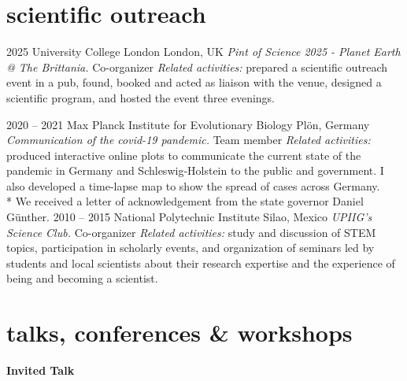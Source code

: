 \documentclass[]{friggeri-cv} %
\begin{document}
\section{scientific outreach}

\begin{entrylist}
\entry
{2025}
{}
{University College London}
{London, UK}
{{\normalsize\emph{Pint of Science 2025 - Planet Earth @ The Brittania.} Co-organizer}}
{\emph{Related activities:} prepared a scientific outreach event in a pub, found, booked and acted as liaison with the venue, designed a scientific program, and hosted the event three evenings.}
\end{entrylist}
\begin{entrylist}
\entry
{2020 -- 2021}
{}
{Max Planck Institute for Evolutionary Biology}
{Plön, Germany}
{{\normalsize\emph{Communication of the covid-19 pandemic.} Team member}}
{\emph{Related activities:} produced interactive online plots to communicate the current state of the pandemic in  Germany and Schleswig-Holstein to the public and government. I also developed a time-lapse map to show the spread of cases across Germany.\\
\** We received a letter of acknowledgement from the state governor Daniel Günther.}
\entry
{2010 -- 2015}
{}
{National Polytechnic Institute}
{Silao, Mexico}
{{\normalsize\emph{UPIIG’s Science Club.} Co-organizer}}
{\emph{Related activities:} study and discussion of STEM topics, participation in scholarly events, and organization of seminars led by students and local scientists about their research expertise and the experience of being and becoming a scientist.}
\end{entrylist}


\section{talks, conferences \& workshops}

\textbf{Invited Talk}
\end{document}
